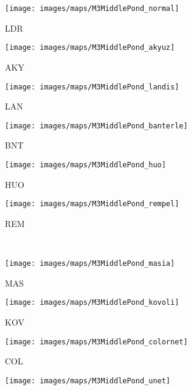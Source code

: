 \documentclass{egpubl}
\begin{document}
\begin{figure*}[htb]
    \centering
    \begin{subfigure}[t]{0.13\linewidth}
        \centering
        \texttt{[image: images/maps/M3MiddlePond\_normal]}
        \caption{LDR}
    \end{subfigure}
    \begin{subfigure}[t]{0.13\linewidth}
        \centering
        \texttt{[image: images/maps/M3MiddlePond\_akyuz]}
        \caption{AKY}
    \end{subfigure}
    \begin{subfigure}[t]{0.13\linewidth}
        \centering
        \texttt{[image: images/maps/M3MiddlePond\_landis]}
        \caption{LAN}
    \end{subfigure}
    \begin{subfigure}[t]{0.13\linewidth}
        \centering
        \texttt{[image: images/maps/M3MiddlePond\_banterle]}
        \caption{BNT}
    \end{subfigure}
    \begin{subfigure}[t]{0.13\linewidth}
        \centering
        \texttt{[image: images/maps/M3MiddlePond\_huo]}
        \caption{HUO}
    \end{subfigure}
    \begin{subfigure}[t]{0.13\linewidth}
        \centering
        \texttt{[image: images/maps/M3MiddlePond\_rempel]}
        \caption{REM}
    \end{subfigure}\\
    \begin{subfigure}[t]{0.13\linewidth}
        \centering
        \texttt{[image: images/maps/M3MiddlePond\_masia]}
        \caption{MAS}
    \end{subfigure}
    \begin{subfigure}[t]{0.13\linewidth}
        \centering
        \texttt{[image: images/maps/M3MiddlePond\_kovoli]}
        \caption{KOV}
    \end{subfigure}
    \begin{subfigure}[t]{0.13\linewidth}
        \centering
        \texttt{[image: images/maps/M3MiddlePond\_colornet]}
        \caption{COL}
    \end{subfigure}
    \begin{subfigure}[t]{0.13\linewidth}
        \centering
        \texttt{[image: images/maps/M3MiddlePond\_unet]}

\end{subfigure}
\end{figure*}
\end{document}
